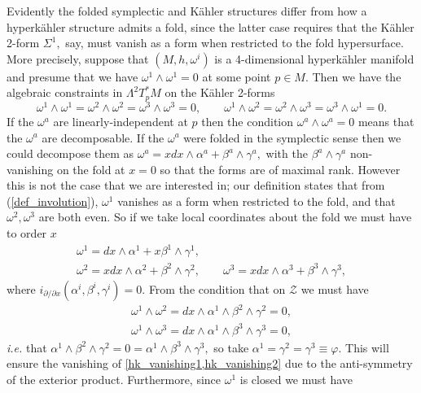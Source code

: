\documentclass[a4paper,12pt, onecolumn, notitlepage]{article}
\theoremstyle{definition}
\theoremstyle{remark}
\newcommand{\ie}{\emph{i.e.} }
\newcommand{\al}{\alpha}
\newcommand{\w}{\omega}
\newcommand{\K}{K\"ahler }
\newcommand{\HK}{hyperk\"ahler }
\begin{document}
Evidently the folded symplectic and \K structures differ from how a \HK structure admits a fold, since the latter case requires that the \K 2-form $\Sigma^{1},$ say, must vanish as a form when restricted to the fold hypersurface. More precisely, suppose that $(M,h,\w^{i})$ is a 4-dimensional \HK manifold and presume that we have $\w^{1}\wedge\w^{1}=0$ at some point $p\in M.$ Then we have the algebraic constraints in $\Lambda^{2}T_{p}^{\ast}M$ on the \K 2-forms
\begin{equation*}
	\w^{1}\wedge\w^{1}=\w^{2}\wedge\w^{2}=\w^{3}\wedge\w^{3}=0, \qquad \w^{1}\wedge\w^{2}=\w^{2}\wedge\w^{3}=\w^{3}\wedge\w^{1}=0.
\end{equation*}
If the $\w^{a}$ are linearly-independent at $p$ then the condition $\w^{a}\wedge\w^{a}=0$ means that the $\w^{a}$ are decomposable. If the $\w^{a}$ were folded in the symplectic sense then we could decompose them as $\w^{a} = xdx\wedge\al^{a} + \beta^{a}\wedge\gamma^{a},$ with the $\beta^{a}\wedge\gamma^{a}$ non-vanishing on the fold at $x=0$ so that the forms are of maximal rank. However this is not the case that we are interested in; our definition states that from (\ref{def_involution}), $\w^{1}$ vanishes as a form when restricted to the fold, and that $\w^{2},\w^{3}$ are both even. So if we take local coordinates about the fold we must have to order $x$
\begin{subequations}
	\begin{gather}
	\label{folded_kforms}
	\w^{1} = dx\wedge\al^{1} + x\beta^{1}\wedge\gamma^{1},\\\nonumber
	\w^{2} = xdx\wedge\al^{2} + \beta^{2}\wedge\gamma^{2},\qquad\w^{3} = xdx\wedge\al^{3} + \beta^{3}\wedge\gamma^{3},
	\end{gather}
\end{subequations}
where $i_{\partial/\partial x}(\al^{i},\beta^{i},\gamma^{i})=0.$ From the condition that on $\mathcal{Z}$ we must have
\begin{subequations}
	\begin{gather}
	\w^{1}\wedge\w^{2}=dx\wedge\al^{1}\wedge\beta^{2}\wedge\gamma^{2} = 0,\label{hk_vanishing1}\\
	\w^{1}\wedge\w^{3}=dx\wedge\al^{1}\wedge\beta^{3}\wedge\gamma^{3} = 0,\label{hk_vanishing2}
	\end{gather}
\end{subequations}
\ie that $\al^{1}\wedge\beta^{2}\wedge\gamma^{2} = 0 = \al^{1}\wedge\beta^{3}\wedge\gamma^{3},$ so take $\al^{1}=\gamma^{2}=\gamma^{3}\equiv\varphi.$ This will ensure the vanishing of \cref{hk_vanishing1,hk_vanishing2} due to the anti-symmetry of the exterior product. Furthermore, since $\w^{1}$ is closed we must have 
\end{document}

